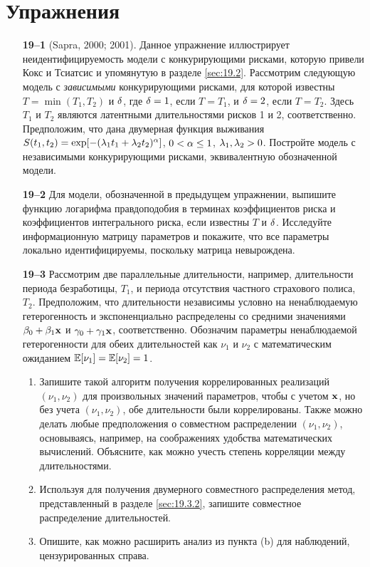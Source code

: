 \section*{Упражнения}
\begin{enumerate}

    \item[\textbf{19--1}]
(Sapra, 2000; 2001). Данное упражнение иллюстрирует неидентифицируемость модели с конкурирующими рисками, которую привели Кокс и Тсиатсис и упомянутую в разделе \ref{sec:19.2}. Рассмотрим следующую модель с \textit{зависимыми} конкурирующими рисками, для которой известны $T = \min(T_1, T_2)$ и $\delta$, где $\delta = 1$, если $T = T_1$, и $\delta = 2$, если $T = T_2$. Здесь $T_1$ и $T_2$ являются латентными длительностями рисков 1 и 2, соответственно. Предположим, что дана двумерная функция выживания $S(t_1, t_2) = \exp[-(\lambda_1 t_1 + \lambda_2 t_2)^\alpha]$, $0 < \alpha \le 1$, $\lambda_1, \lambda_2 > 0$. Постройте модель с независимыми конкурирующими рисками, эквивалентную обозначенной модели.

    \item[\textbf{19--2}]
Для модели, обозначенной в предыдущем упражнении, выпишите функцию логарифма правдоподобия в терминах коэффициентов риска и коэффициентов интегрального риска, если известны $T$ и $\delta$. Исследуйте информационную матрицу параметров и покажите, что все параметры локально идентифицируемы, поскольку матрица невырождена.

    \item[\textbf{19--3}]
Рассмотрим две параллельные длительности, например, длительности периода безработицы, $T_1$, и периода отсутствия частного страхового полиса, $T_2$. Предположим, что длительности независимы условно на ненаблюдаемую гетерогенность и экспоненциально распределены со средними значениями $\beta_0 + \beta_1\mathbf{x}$ и $\gamma_0 + \gamma_1\mathbf{x}$, соответственно. Обозначим параметры ненаблюдаемой гетерогенности для обеих длительностей как $\nu_1$ и $\nu_2$ с математическим ожиданием $\mathbb{E}[\nu_1] = \mathbb{E}[\nu_2] = 1$.
        \begin{enumerate}
        \item
Запишите такой алгоритм получения коррелированных реализаций $(\nu_1, \nu_2)$ для произвольных значений параметров, чтобы с учетом $\mathbf{x}$, но без учета $(\nu_1, \nu_2)$, обе длительности были коррелированы. Также можно делать любые предположения о совместном распределении $(\nu_1, \nu_2)$, основываясь, например, на соображениях удобства математических вычислений. Объясните, как можно учесть степень корреляции между длительностями.
        \item
Используя для получения двумерного совместного распределения метод, представленный в разделе \ref{sec:19.3.2}, запишите совместное распределение длительностей.
        \item
Опишите, как можно расширить анализ из пункта (b) для наблюдений, цензурированных справа.
        \end{enumerate}



\end{enumerate}
